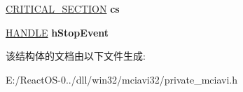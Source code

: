 \begin{DoxyCompactItemize}
\begin{tabbing}
\end{tabbing}\item 
\mbox{\label{struct_w_i_n_e___m_c_i_a_v_i_a46ffe780ad0909a090968bd189a90ba0}} 
\hyperlink{struct___c_r_i_t_i_c_a_l___s_e_c_t_i_o_n}{C\+R\+I\+T\+I\+C\+A\+L\+\_\+\+S\+E\+C\+T\+I\+ON} {\bfseries cs}
\item 
\mbox{\label{struct_w_i_n_e___m_c_i_a_v_i_a0b6dfb3120d9ed49c6d93e4a81f92272}} 
\hyperlink{interfacevoid}{H\+A\+N\+D\+LE} {\bfseries h\+Stop\+Event}
\end{DoxyCompactItemize}


该结构体的文档由以下文件生成\+:\begin{DoxyCompactItemize}
\item 
E\+:/\+React\+O\+S-\/0../dll/win32/mciavi32/private\+\_\+mciavi.\+h\end{DoxyCompactItemize}
